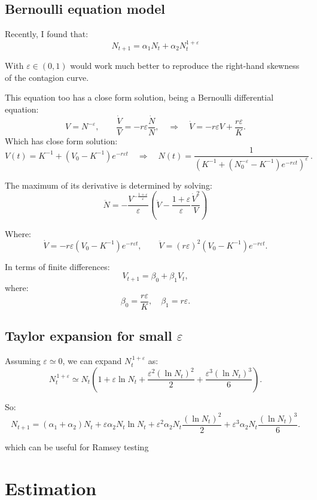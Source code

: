 \documentclass[12pt]{article}
\begin{document}
    \subsection{Bernoulli equation model}

    Recently, I found that:
    \begin{equation}
        N_{t+1} = \alpha_1 N_t + \alpha_2 N_{t}^{1 + \varepsilon}
        \label{eq:equation0}
    \end{equation}

    With $\varepsilon \in (0,1)$ would work much better to reproduce the right-hand skewness of the contagion curve.

    This equation too has a close form solution, being a Bernoulli differential equation:
    $$V = N^{-\varepsilon}, \qquad \frac{\dot V}{V} = -r \varepsilon \frac{\dot N}{N}, \quad \Rightarrow \quad \dot V = -r\varepsilon V + \frac{r\varepsilon}{K}. $$
    Which has close form solution:
    $$ V(t) = K^{-1} + \left(V_0-K^{-1}\right)e^{-r\varepsilon t} \quad \Rightarrow \quad N(t)=\frac{1}{\left(K^{-1} + \left(N_0^{-\varepsilon}-K^{-1}\right)e^{-r\varepsilon t}\right)^\varepsilon}\,.$$

    The maximum of its derivative is determined by solving:
    $$ \ddot N = -\frac{V^{-\frac{1+\varepsilon}{\varepsilon}}}{\varepsilon} \left(\ddot V -\frac{1+\varepsilon}{\varepsilon} \frac{\dot V ^2}{V}\right)$$

    Where:
    $$ \dot V = -r\varepsilon\left(V_0-K^{-1}\right)e^{-r\varepsilon t}, \qquad \ddot V = (r\varepsilon)^2 \left(V_0-K^{-1}\right)e^{-r\varepsilon t}. $$

    In terms of finite differences:
    $$ V_{t+1} = \beta_0 + \beta_1 V_t,$$
    where:
    $$\beta_0 = \frac{r \varepsilon}{K}, \quad \beta_1=  r\varepsilon.$$

    \subsection{Taylor expansion for small $\varepsilon$}
    Assuming $\varepsilon \simeq 0$, we can expand $N_{t}^{\,1+\varepsilon}$ as:
    \begin{equation}
        N_{t}^{\,1+\varepsilon} \simeq N_{t} \left( 1 + \varepsilon \ln N_{t} + \frac{\varepsilon^2 (\ln N_{t})^2}{2} + \frac{\varepsilon^3 (\ln N_{t})^3}{6} \right).
    \end{equation}

    So:
        \begin{equation}
        N_{t+1} = (\alpha_1 + \alpha_2) N_{t} + \varepsilon \alpha_2 N_{t}\ln N_{t} + \varepsilon^2 \alpha_2 N_{t} \frac{ (\ln N_{t})^2}{2} + \varepsilon^3 \alpha_2 N_{t} \frac{(\ln N_{t})^3}{6}.
        \end{equation}
    \newpage

    which can be useful for Ramsey testing

    \section{Estimation}\label{sec:estimation}
    
\end{document}
